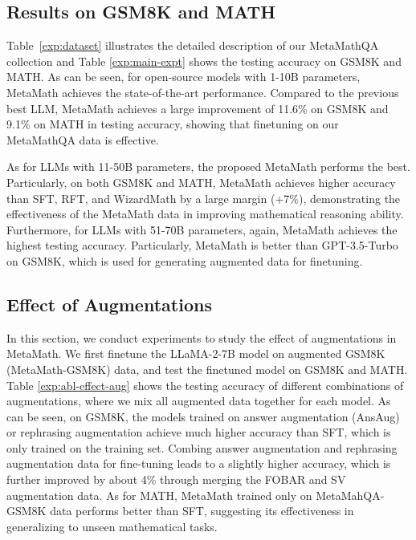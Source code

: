     \vspace{-1mm}
    \subsection{Results on GSM8K and MATH}
    \vspace{-1.5mm}

    Table~\ref{exp:dataset} illustrates the detailed description of our MetaMathQA collection and 
    Table \ref{exp:main-expt}
    shows the testing accuracy on GSM8K and MATH.
    As can be seen,
    for open-source models with 
    1-10B parameters,
    MetaMath achieves the state-of-the-art performance.
    Compared to the previous best LLM, MetaMath achieves a large improvement of 11.6\% on GSM8K and 9.1\% on MATH in testing accuracy,
    showing that finetuning on our MetaMathQA data is effective.

    
    
     
   
    
    As for LLMs with 11-50B parameters,
    the proposed MetaMath performs the best.
    Particularly,
    on both GSM8K and MATH,
    MetaMath achieves higher accuracy than SFT, RFT, and WizardMath
    by a large margin (+7\%), demonstrating 
    the effectiveness of the MetaMath data in improving mathematical reasoning ability.
    Furthermore,
    for LLMs with 51-70B parameters,
    again, 
    MetaMath achieves the highest testing accuracy.
    Particularly,
    MetaMath is better than GPT-3.5-Turbo on GSM8K, 
    which is used for generating augmented data for finetuning.
    
    
    \vspace{-2mm}
	\subsection{Effect of Augmentations} \label{sec:eff-aug}
    \vspace{-1.5mm}
	
	In this section,
	we conduct experiments 
	to study
	the effect of augmentations in MetaMath.
	We first finetune the {LLaMA-2-7B}
	model on augmented GSM8K (MetaMath-GSM8K) data, 
	and test the finetuned model 
	on GSM8K and MATH.
	Table \ref{exp:abl-effect-aug}
	shows the testing accuracy of
	different combinations of augmentations{, where we mix all augmented data together for each model}.
	As can be seen, 
	on GSM8K,
	the models trained on answer augmentation (AnsAug) or rephrasing  augmentation 
	achieve much higher
	accuracy than SFT, which is only trained on 
	the training set.
	Combing answer augmentation and rephrasing  augmentation data
	for fine-tuning leads to a slightly higher accuracy,
	which is further improved by about 4\% through merging the FOBAR and SV augmentation data.
	As for MATH,
	MetaMath trained only on MetaMahQA-GSM8K data
	performs better than SFT, suggesting its effectiveness in generalizing to
	unseen mathematical tasks. 
	
